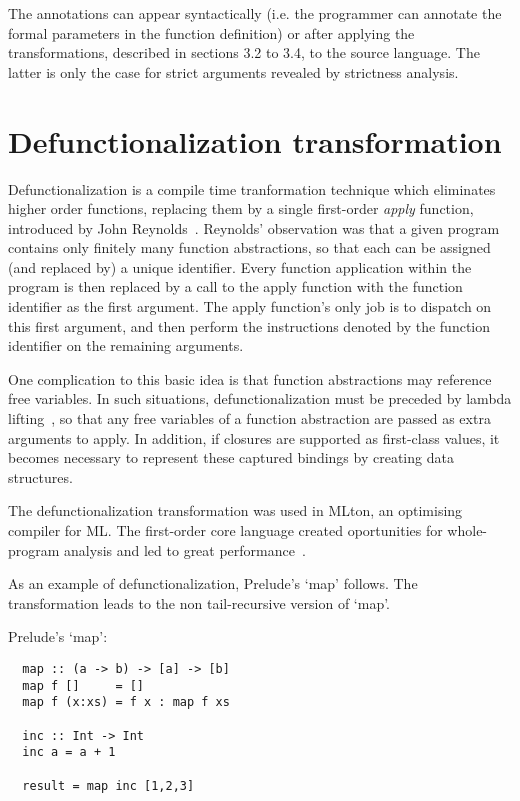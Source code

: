 \documentclass[diploma]{softlab-thesis}
\begin{document}
The annotations can appear syntactically (i.e. the programmer can annotate 
the formal parameters in the function definition) or 
after applying the transformations, described in sections 3.2 to 3.4, 
to the source language. The latter
is only the case for strict arguments revealed by strictness analysis.

\section {Defunctionalization transformation}
\label{sec:defunctionalization}

Defunctionalization is a compile time tranformation technique which eliminates higher order 
functions, replacing them by a single first-order \textit{apply} function, introduced by John Reynolds~\cite{Reynolds72definitionalinterpreters}.
Reynolds' observation was that a given program contains only finitely many function abstractions, so that each can 
be assigned (and replaced by) a unique identifier. Every function application within the program is then replaced 
by a call to the apply function with the function identifier as the first argument. The apply function's only job is 
to dispatch on this first argument, and then perform the instructions denoted by the function identifier on the 
remaining arguments.

One complication to this basic idea is that function abstractions may reference free variables. In such situations, 
defunctionalization must be preceded by lambda lifting~\cite{Johnsson:1985:LLT:5280.5292}, so that any free variables of a function 
abstraction are passed as extra arguments to apply. In addition, if closures are supported as first-class values, 
it becomes necessary to represent these captured bindings by creating data structures.

The defunctionalization transformation was used in MLton, an optimising compiler for ML. The first-order
core language created oportunities for whole-program analysis and led to great performance~\cite{mlton}.

As an example of defunctionalization, Prelude's `map' follows. The transformation leads to 
the non tail-recursive version of `map'.

Prelude's `map':

\begin{verbatim}
  map :: (a -> b) -> [a] -> [b]
  map f []     = []
  map f (x:xs) = f x : map f xs

  inc :: Int -> Int 
  inc a = a + 1
  
  result = map inc [1,2,3]
\end{verbatim}
\end{document}
